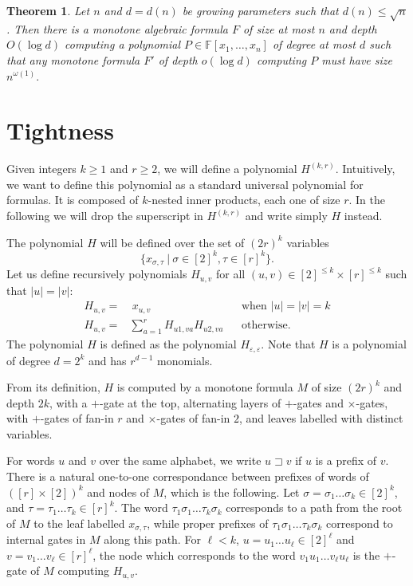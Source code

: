 \documentclass[10pt,a4paper]{article}
\newtheorem{theorem}{Theorem}
\newcommand{\F}{\mathbb{F}}
\newcommand{\prefix}{\sqsupset}
\newcommand{\comment}[2]{\marginpar{\tiny{\textbf{#1: }\textit{#2}}}}
\newcommand{\hf}[1]{\comment{HF}{#1}}
\begin{document}
\begin{theorem}
	\label{thm:lowerbound}
	Let $n$ and $d = d(n)$ be growing parameters such that $d(n)\leq \sqrt{n}$. Then there is a monotone algebraic formula $F$ of size at most $n$ and depth $O(\log d)$ computing a polynomial $P\in \F[x_1,\ldots,x_n]$ of degree at most $d$ such that any monotone formula $F'$ of depth $o(\log d)$ computing $P$ must have size $n^{\omega(1)}.$
\end{theorem}

\section{Tightness}

\label{sec:tightness}


Given integers $k \geq 1$ and $r \geq 2$, we will define a polynomial $H^{(k,r)}$.
Intuitively, we want to define this polynomial as a standard universal polynomial for formulas. It is composed of \(k\)-nested inner products, each one of size \(r\).
In the following we will drop the superscript in $H^{(k,r)}$ and write simply $H$ instead.

The polynomial $H$ will be defined over the set of
$(2r)^k$  variables
$$\{x_{\sigma,\tau}\ |\ \sigma\in [2]^k, \tau \in [r]^{k}\}.$$
Let us define recursively polynomials $H_{u,v}$ for all $(u,v) \in [2]^{\leq k} \times [r]^{\leq k}$ such that $|u|=|v|$:
\begin{align*}
	H_{u,v} = & \ x_{u,v} 	&& \text{when }|u|=|v|=k\\
	H_{u,v} = & \sum_{a=1}^{r} H_{u 1,v a} H_{u 2, v a} && \text{otherwise}.
\end{align*}
The polynomial $H$ is defined as the polynomial \(H_{\varepsilon,\varepsilon}\).
Note that $H$ is a polynomial of degree $d=2^k$ and has $r^{d-1}$ monomials.

From its definition, $H$ is computed by a monotone formula $M$
of size $(2r)^k$
and depth $2k$,
with a $+$-gate at the top, alternating layers of $+$-gates and $\times$-gates, with $+$-gates of fan-in $r$
and $\times$-gates of fan-in $2$, and leaves labelled with distinct variables.

For words $u$ and $v$ over the same alphabet, we write $u \prefix v$ if $u$ is a prefix of $v$.
There is a natural one-to-one correspondance between prefixes of words of $([r]\times[2])^k$
and nodes of $M$, which is the following.
Let $\sigma = \sigma_1 \ldots \sigma_k \in [2]^k$, and $\tau = \tau_1 \ldots \tau_{k} \in [r]^{k}$.
The word $\tau_1 \sigma_1 \ldots \tau_k \sigma_k$ corresponds to a path from the root of $M$
to the leaf labelled $x_{\sigma,\tau}$, while proper prefixes of $\tau_1 \sigma_1 \ldots \tau_k \sigma_k$
correspond to internal gates in $M$ along this path.
For $\ell < k$, $u=u_1\ldots u_\ell \in [2]^\ell$ and $v=v_1 \ldots v_\ell \in [r]^\ell$,
the node which corresponds to the word $v_1 u_1 \ldots v_\ell u_\ell$ is the $+$-gate of $M$ computing $H_{u,v}$.
\end{document}
